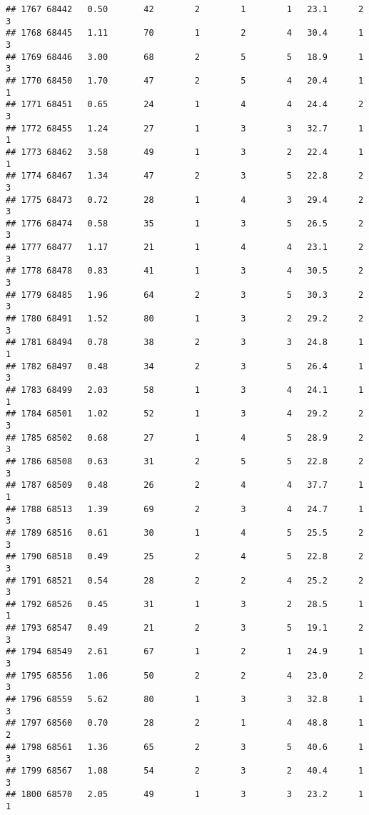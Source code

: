 \documentclass[
]{article}
\begin{document}
\begin{verbatim}
## 1767 68442   0.50       42        2        1        1   23.1      2      3
## 1768 68445   1.11       70        1        2        4   30.4      1      3
## 1769 68446   3.00       68        2        5        5   18.9      1      3
## 1770 68450   1.70       47        2        5        4   20.4      1      1
## 1771 68451   0.65       24        1        4        4   24.4      2      3
## 1772 68455   1.24       27        1        3        3   32.7      1      1
## 1773 68462   3.58       49        1        3        2   22.4      1      1
## 1774 68467   1.34       47        2        3        5   22.8      2      3
## 1775 68473   0.72       28        1        4        3   29.4      2      3
## 1776 68474   0.58       35        1        3        5   26.5      2      3
## 1777 68477   1.17       21        1        4        4   23.1      2      3
## 1778 68478   0.83       41        1        3        4   30.5      2      3
## 1779 68485   1.96       64        2        3        5   30.3      2      3
## 1780 68491   1.52       80        1        3        2   29.2      2      3
## 1781 68494   0.78       38        2        3        3   24.8      1      1
## 1782 68497   0.48       34        2        3        5   26.4      1      3
## 1783 68499   2.03       58        1        3        4   24.1      1      1
## 1784 68501   1.02       52        1        3        4   29.2      2      3
## 1785 68502   0.68       27        1        4        5   28.9      2      3
## 1786 68508   0.63       31        2        5        5   22.8      2      3
## 1787 68509   0.48       26        2        4        4   37.7      1      1
## 1788 68513   1.39       69        2        3        4   24.7      1      3
## 1789 68516   0.61       30        1        4        5   25.5      2      3
## 1790 68518   0.49       25        2        4        5   22.8      2      3
## 1791 68521   0.54       28        2        2        4   25.2      2      3
## 1792 68526   0.45       31        1        3        2   28.5      1      1
## 1793 68547   0.49       21        2        3        5   19.1      2      3
## 1794 68549   2.61       67        1        2        1   24.9      1      3
## 1795 68556   1.06       50        2        2        4   23.0      2      3
## 1796 68559   5.62       80        1        3        3   32.8      1      3
## 1797 68560   0.70       28        2        1        4   48.8      1      2
## 1798 68561   1.36       65        2        3        5   40.6      1      3
## 1799 68567   1.08       54        2        3        2   40.4      1      3
## 1800 68570   2.05       49        1        3        3   23.2      1      1

\end{verbatim}
\end{document}
